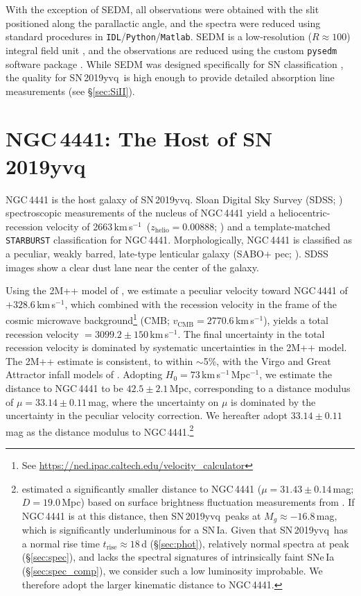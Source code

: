\documentclass[twocolumn]{aastex63}
\newcommand{\kms}{km\,s$^{-1}$}
\newcommand{\sn}{SN\,2019yvq}
\begin{document}
With the exception of SEDM, all observations were obtained with the
slit positioned along the parallactic angle, and the spectra were reduced
using standard procedures in \texttt{IDL}/\texttt{Python}/\texttt{Matlab}.
SEDM is a low-resolution ($R \approx 100$) integral field unit
\citep{Blagorodnova18}, and the observations are reduced using the custom
\texttt{pysedm} software package \citep{Rigault19}. While SEDM was designed
specifically for SN classification \citep[e.g.,][]{Fremling20}, the quality
for \sn\ is high enough to provide detailed absorption line measurements (see
\S\ref{sec:SiII}).

\section{NGC\,4441: The Host of \sn}\label{sec:host}

NGC\,4441 is the host galaxy of \sn. Sloan Digital Sky Survey (SDSS;
\citealt{York00}) spectroscopic measurements of the nucleus of NGC\,4441 yield
a heliocentric-recession velocity of 2663\,\kms\ ($z_\mathrm{helio} =
0.00888$; \citealt{Abolfathi18}) and a template-matched \texttt{STARBURST}
classification for NGC\,4441. Morphologically, NGC\,4441 is classified as a
peculiar, weakly barred, late-type lenticular galaxy (SABO$+$ pec;
\citealt{de-Vaucouleurs91}). SDSS images show a clear dust lane near the
center of the galaxy.

Using the 2M++ model of \citet{Carrick15}, we estimate a peculiar velocity
toward NGC\,4441 of $+328.6$\,\kms, which combined with the recession
velocity in the frame of the cosmic microwave background\footnote{See
\url{https://ned.ipac.caltech.edu/velocity_calculator}} (CMB; $v_\mathrm{CMB}
= 2770.6$\,\kms), yields a total recession velocity $= 3099.2 \pm 150$\,\kms.
The final uncertainty in the total recession velocity is dominated by
systematic uncertainties in the 2M++ model. The 2M++ estimate is consistent,
to within $\sim$5\%, with the Virgo and Great Attractor infall models of
\citet{Mould00}. Adopting $H_0 = 73$\,\kms\,Mpc$^{-1}$, we estimate the
distance to NGC\,4441 to be $42.5 \pm 2.1$\,Mpc, corresponding to a distance
modulus of $\mu = 33.14 \pm 0.11$\,mag, where the uncertainty on $\mu$ is
dominated by the uncertainty in the peculiar velocity correction. We hereafter
adopt $33.14 \pm 0.11$\,mag as the distance modulus to
NGC\,4441.\footnote{\citet{Tully13} estimated a significantly smaller distance
to NGC\,4441 ($\mu = 31.43 \pm 0.14$\,mag; $D = 19.0$\,Mpc) based on surface
brightness fluctuation measurements from \citet{Tonry01}. If NGC\,4441 is at
this distance, then \sn\ peaks at $M_g \approx -16.8$\,mag, which is
significantly underluminous for a SN\,Ia. Given that \sn\ has a normal rise
time $t_\mathrm{rise} \approx 18$\,d (\S\ref{sec:phot}), relatively normal
spectra at peak (\S\ref{sec:spec}), and lacks the spectral signatures of
intrinsically faint SNe\,Ia (\S\ref{sec:spec_comp}), we consider such a low
luminosity improbable. We therefore adopt the larger kinematic distance to
NGC\,4441.}
\end{document}
